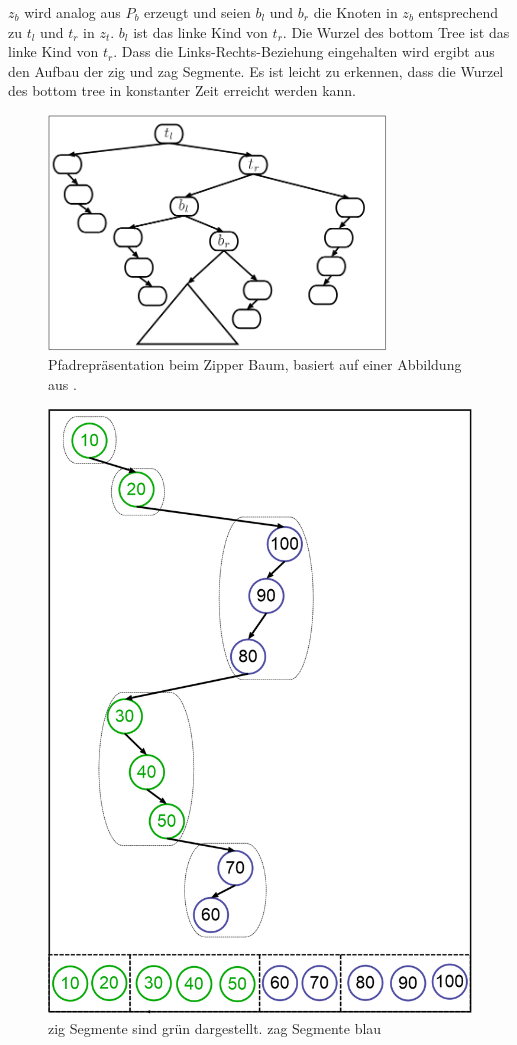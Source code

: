 \documentclass[a4paper,12pt]{article}
\begin{document}
$z_b$ wird analog aus $P_b$ erzeugt und seien $b_l$ und $b_r$ die Knoten in $z_b$ entsprechend zu $t_l$ und $t_r$ in $z_t$. $b_l$ ist das linke Kind von $t_r$. Die Wurzel des bottom Tree ist das linke Kind von $t_r$. Dass die Links-Rechts-Beziehung eingehalten wird ergibt aus den Aufbau der zig und zag Segmente. Es ist leicht zu erkennen, dass die Wurzel des bottom tree in konstanter Zeit erreicht werden kann.
\begin{figure}[H]
	\includegraphics[width= 0.8\textwidth]{"Medien/Zipper/zipperPathRep"}
	\caption{Pfadrepräsentation beim Zipper Baum, basiert auf einer Abbildung aus \cite{zipper}. }
	\label{fig:zipperPathRep}
\end{figure}
\begin{figure}[H]
	\centering
	\includegraphics[height= 0.7\textwidth]{"Medien/Zipper/preferredPathZigZag"}
	\caption{zig Segmente sind grün dargestellt. zag Segmente blau }
	\label{fig:preferredPathZigZag}
\end{figure}
\end{document}
